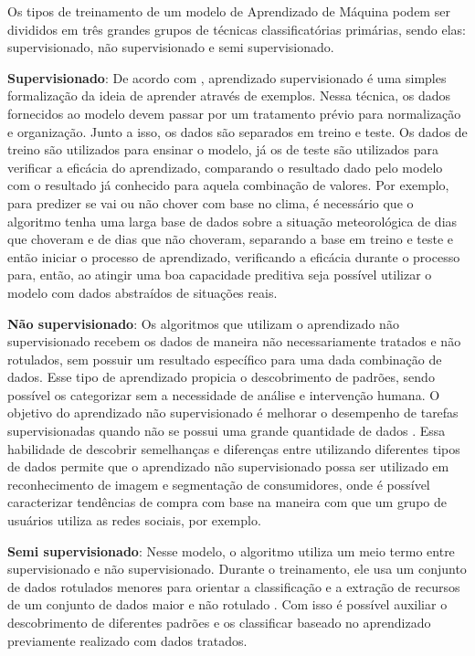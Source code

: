 Os tipos de treinamento de um modelo de Aprendizado de Máquina podem
ser divididos em três grandes grupos de técnicas classificatórias
primárias, sendo elas: supervisionado, não supervisionado e semi
supervisionado.

\textbf{Supervisionado}: De acordo com , aprendizado
supervisionado é uma simples formalização da ideia de aprender através
de exemplos. Nessa técnica, os dados fornecidos ao modelo devem passar
por um tratamento prévio para normalização e organização. Junto a
isso, os dados são separados em treino e teste. Os dados de treino são
utilizados para ensinar o modelo, já os de teste são utilizados para
verificar a eficácia do aprendizado, comparando o resultado dado pelo
modelo com o resultado já conhecido para aquela combinação de
valores. Por exemplo, para predizer se vai ou não chover com base no
clima, é necessário que o algoritmo tenha uma larga base de dados
sobre a situação meteorológica de dias que choveram e de dias que não
choveram, separando a base em treino e teste e então iniciar o
processo de aprendizado, verificando a eficácia durante o processo
para, então, ao atingir uma boa capacidade preditiva seja possível
utilizar o modelo com dados abstraídos de situações reais.

\textbf{Não supervisionado}: Os algoritmos que utilizam o aprendizado não
supervisionado recebem os dados de maneira não necessariamente
tratados e não rotulados, sem possuir um resultado específico para uma
dada combinação de dados. Esse tipo de aprendizado propicia o
descobrimento de padrões, sendo possível os categorizar sem a
necessidade de análise e intervenção humana. O objetivo do aprendizado
não supervisionado é melhorar o desempenho de tarefas supervisionadas
quando não se possui uma grande quantidade de dados
\cite{sutskever2015}. Essa habilidade de descobrir semelhanças e
diferenças entre utilizando diferentes tipos de dados permite que o
aprendizado não supervisionado possa ser utilizado em reconhecimento
de imagem e segmentação de consumidores, onde é possível caracterizar
tendências de compra com base na maneira com que um grupo de usuários
utiliza as redes sociais, por exemplo.

\textbf{Semi supervisionado}: Nesse modelo, o algoritmo utiliza um meio termo
entre supervisionado e não supervisionado. Durante o treinamento, ele
usa um conjunto de dados rotulados menores para orientar a
classificação e a extração de recursos de um conjunto de dados maior e
não rotulado \cite{uibm2022}. Com isso é possível auxiliar o
descobrimento de diferentes padrões e os classificar baseado no
aprendizado previamente realizado com dados tratados.

